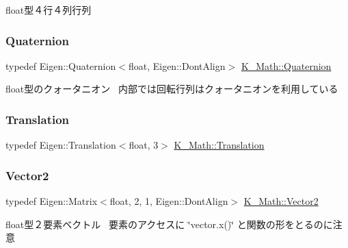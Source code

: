 float型４行４列行列 

\mbox{\label{namespace_k___math_a9bc4dcabcbd509e9dc53ae0ecb07a17c}} 
\subsubsection{\texorpdfstring{Quaternion}{Quaternion}}
{\footnotesize\ttfamily typedef Eigen\+::\+Quaternion$<$float, Eigen\+::\+Dont\+Align$>$ \mbox{\hyperlink{namespace_k___math_a9bc4dcabcbd509e9dc53ae0ecb07a17c}{K\+\_\+\+Math\+::\+Quaternion}}}



float型のクォータニオン~\newline
内部では回転行列はクォータニオンを利用している 

\mbox{\label{namespace_k___math_a9a67bf2cbf95f0824bee5e5f79570ba4}} 
\subsubsection{\texorpdfstring{Translation}{Translation}}
{\footnotesize\ttfamily typedef Eigen\+::\+Translation$<$float, 3$>$ \mbox{\hyperlink{namespace_k___math_a9a67bf2cbf95f0824bee5e5f79570ba4}{K\+\_\+\+Math\+::\+Translation}}}

\mbox{\label{namespace_k___math_a41eb0c2c69c938cd59989eb3241cefb2}} 
\subsubsection{\texorpdfstring{Vector2}{Vector2}}
{\footnotesize\ttfamily typedef Eigen\+::\+Matrix$<$float, 2, 1, Eigen\+::\+Dont\+Align$>$ \mbox{\hyperlink{namespace_k___math_a41eb0c2c69c938cd59989eb3241cefb2}{K\+\_\+\+Math\+::\+Vector2}}}



float型２要素ベクトル~\newline
要素のアクセスに \char`\"{}vector.\+x()\char`\"{} と関数の形をとるのに注意 

\mbox{\label{namespace_k___math_a66884d78082c39ada4091c211f3570f8}} 
